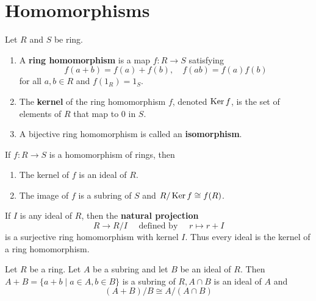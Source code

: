 \section{Homomorphisms}  %

\begin{definition}
    Let $R$ and $S$ be ring.
    \begin{enumerate}
        \item
              A \textbf{ring homomorphism} is a map $f: R \rightarrow S$ satisfying
              \begin{equation*}
                  f(a+b)=f(a)+f(b), \quad
                  f(a b)=f(a) f(b)
              \end{equation*}
              for all $a, b \in R$ and $f(1_R)=1_S$.
        \item
              The \textbf{kernel} of the ring homomorphism $f$, denoted $\operatorname{\operatorname{Ker}} f$, is the set of elements of $R$ that map to $0$ in $S$.

        \item
              A bijective ring homomorphism is called an \textbf{isomorphism}.
    \end{enumerate}
\end{definition}


\begin{theorem}
    If $f: R \rightarrow S$ is a homomorphism of rings, then
    \begin{enumerate}
        \item
              The kernel of $f$ is an ideal of $R$.

        \item
              The image of $f$ is a subring of $S$ and $R / \operatorname{\operatorname{Ker}} f\cong f(R)$.
    \end{enumerate}
\end{theorem}

\begin{corollary}
    If $I$ is any ideal of $R$, then the \textbf{natural projection}
    \begin{equation*}
        R \rightarrow R / I \quad \text { defined by } \quad r \mapsto r+I
    \end{equation*}
    is a surjective ring homomorphism with kernel $I$. Thus every ideal is the kernel of a ring homomorphism.
\end{corollary}


\begin{theorem}
    Let $R$ be a ring. Let $A$ be a subring and let $B$ be an ideal of $R$. Then $A+B=\{a+b \mid a \in A, b \in B\}$ is a subring of $R, A \cap B$ is an ideal of $A$ and \begin{equation*}
        (A+B) / B \cong A /(A \cap B)
    \end{equation*}
\end{theorem}


